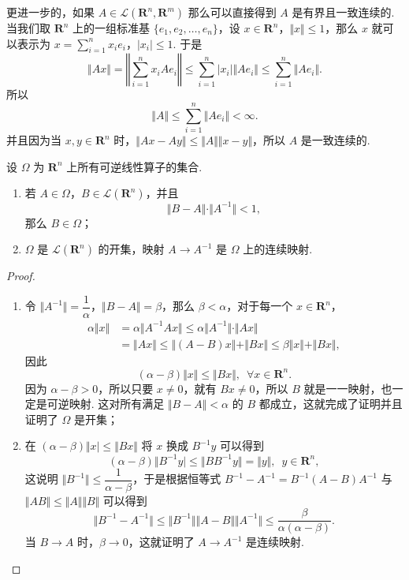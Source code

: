 更进一步的，如果 $A\in \mathcal{L}(\mathbf{R}^n, \mathbf{R}^m)$ 那么可以直接得到 $A$ 是有界且一致连续的. 当我们取 $\mathbf{R}^n$ 上的一组标准基 $\{e_1, e_2, \ldots, e_n\}$，设 $x\in \mathbf{R}^n$，$\Vert x\Vert \leqslant 1$，那么 $x$ 就可以表示为 $x = \displaystyle\sum_{i=1}^{n} x_ie_i$，$\vert x_i \vert \leqslant 1$. 于是
\[\Vert Ax\Vert = \left\Vert \sum_{i=1}^{n} x_iAe_i\right\Vert \leqslant \sum_{i=1}^{n}\vert x_i\vert \Vert Ae_i\Vert \leqslant \sum_{i=1}^{n}\Vert Ae_i\Vert.\]
所以\[\Vert A\Vert \leqslant \sum_{i=1}^{n}\Vert Ae_i\Vert < \infty.\]
并且因为当 $x, y\in \mathbf{R}^n$ 时，$\Vert Ax - Ay \Vert \leqslant \Vert A\Vert\Vert x-y\Vert$，所以 $A$ 是一致连续的.

\begin{theorem}{}{}
    设 $\Omega$ 为 $\mathbf{R}^n$ 上所有可逆线性算子的集合.
    \begin{enumerate}
        \item 若 $A\in \Omega$，$B\in \mathcal{L}(\mathbf{R}^n)$，并且 \[\Vert B-A\Vert\cdot\Vert A^{-1}\Vert < 1,\]那么 $B\in \Omega$；
        \item $\Omega$ 是 $\mathcal{L}(\mathbf{R}^n)$ 的开集，映射 $A\to A^{-1}$ 是 $\Omega$ 上的连续映射.
    \end{enumerate}
\end{theorem}

\begin{proof}
    \begin{enumerate}
        \item 令 $\Vert A^{-1}\Vert = \dfrac{1}{\alpha}$，$\Vert B-A\Vert = \beta$，那么 $\beta < \alpha$，对于每一个 $x\in \mathbf{R}^n$，
              \begin{align}
                  \alpha\Vert x\Vert & = \alpha\Vert A^{-1}Ax\Vert \leqslant \alpha \Vert A^{-1}\Vert \cdot \Vert Ax \Vert                        \\
                                     & = \Vert Ax\Vert \leqslant \Vert (A - B)x\Vert + \Vert Bx\Vert \leqslant \beta\Vert x\Vert + \Vert Bx\Vert,
              \end{align}
              因此 \[(\alpha - \beta)\Vert x\Vert \leqslant \Vert Bx\Vert,\enspace \forall x\in \mathbf{R}^n.\]
              因为 $\alpha - \beta > 0$，所以只要 $x\neq 0$，就有 $Bx\neq 0$，所以 $B$ 就是一一映射，也一定是可逆映射. 这对所有满足 $\Vert B - A\Vert < \alpha$ 的 $B$ 都成立，这就完成了证明并且证明了 $\Omega$ 是开集；
        \item 在 $(\alpha - \beta)\Vert x\vert \leqslant \Vert Bx\Vert$ 将 $x$ 换成 $B^{-1}y$ 可以得到 \[(\alpha - \beta)\Vert B^{-1}y\vert \leqslant \Vert BB^{-1}y\Vert = \Vert y\Vert,\enspace y\in \mathbf{R}^n,\]
              这说明 $\Vert B^{-1}\Vert \leqslant \dfrac{1}{\alpha - \beta}$，于是根据恒等式 $B^{-1} - A^{-1} = B^{-1}(A - B)A^{-1}$ 与 $\Vert AB\Vert \leqslant \Vert A\Vert \Vert B\Vert$ 可以得到 \[\Vert B^{-1} - A^{-1}\Vert \leqslant \Vert B^{-1}\Vert\Vert A - B\Vert\Vert A^{-1}\Vert \leqslant \dfrac{\beta}{\alpha(\alpha - \beta)}.\]
              当 $B\to A$ 时，$\beta\to 0$，这就证明了 $A\to A^{-1}$ 是连续映射.
    \end{enumerate}
\end{proof}

